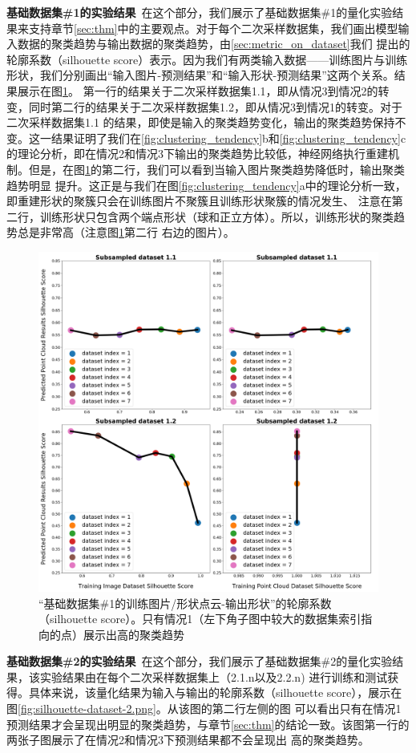 \documentclass[bachelor, nocolorlinks, printoneside]{seuthesis} %
\begin{document}
\begin{Main}
\textbf{基础数据集\#1的实验结果}~在这个部分，我们展示了基础数据集\#1的量化实验结果来支持章节\ref{sec:thm}中的主要观点。对于每个二次采样数据集，我们画出模型输入数据的聚类趋势与输出数据的聚类趋势，由\ref{sec:metric_on_dataset}我们
提出的轮廓系数（silhouette score）表示。因为我们有两类输入数据——训练图片与训练形状，我们分别画出“输入图片-预测结果”和“输入形状-预测结果”这两个关系。结果展示在图\ref{fig:silhouette-dataset-1.png}。
第一行的结果关于二次采样数据集1.1，即从情况3到情况2的转变，同时第二行的结果关于二次采样数据集1.2，即从情况3到情况1的转变。对于二次采样数据集1.1
的结果，即使是输入的聚类趋势变化，输出的聚类趋势保持不变。这一结果证明了我们在\ref{fig:clustering_tendency}b和\ref{fig:clustering_tendency}c
的理论分析，即在情况2和情况3下输出的聚类趋势比较低，神经网络执行重建机制。但是，在图\ref{fig:silhouette-dataset-1.png}的第二行，我们可以看到当输入图片聚类趋势降低时，输出聚类趋势明显
提升。这正是与我们在图\ref{fig:clustering_tendency}a中的理论分析一致，即重建形状的聚簇只会在训练图片不聚簇且训练形状聚簇的情况发生、
注意在第二行，训练形状只包含两个端点形状（球和正立方体）。所以，训练形状的聚类趋势总是非常高（注意图\ref{fig:silhouette-dataset-1.png}第二行
右边的图片）。

\begin{figure}[h!]
    \centering
    \includegraphics[width=.95\textwidth]{figs/silhouette-dataset-1.png}
    \caption{\small “基础数据集\#1的训练图片/形状点云-输出形状”的轮廓系数（silhouette score）。只有情况1（左下角子图中较大的数据集索引指向的点）展示出高的聚类趋势}
    \label{fig:silhouette-dataset-1.png}
\end{figure}
\FloatBarrier
\textbf{基础数据集\#2的实验结果}~在这个部分，我们展示了基础数据集\#2的量化实验结果，该实验结果由在每个二次采样数据集上（2.1.n以及2.2.n)
进行训练和测试获得。具体来说，该量化结果为输入与输出的轮廓系数（silhouette score），展示在图\ref{fig:silhouette-dataset-2.png}。从该图的第二行左侧的图
可以看出只有在情况1预测结果才会呈现出明显的聚类趋势，与章节\ref{sec:thm}的结论一致。该图第一行的两张子图展示了在情况2和情况3下预测结果都不会呈现出
高的聚类趋势。


\end{Main}
\end{document}
